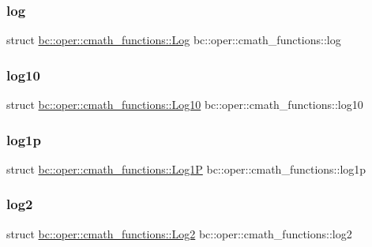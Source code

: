 \subsubsection{\texorpdfstring{log}{log}}
{\footnotesize\ttfamily struct \hyperlink{structbc_1_1oper_1_1cmath__functions_1_1Log}{bc\+::oper\+::cmath\+\_\+functions\+::\+Log}   bc\+::oper\+::cmath\+\_\+functions\+::log}

\mbox{\label{namespacebc_1_1oper_1_1cmath__functions_acb5070f623c08a42cdf87cc9e9bfd90e}} 
\subsubsection{\texorpdfstring{log10}{log10}}
{\footnotesize\ttfamily struct \hyperlink{structbc_1_1oper_1_1cmath__functions_1_1Log10}{bc\+::oper\+::cmath\+\_\+functions\+::\+Log10}   bc\+::oper\+::cmath\+\_\+functions\+::log10}

\mbox{\label{namespacebc_1_1oper_1_1cmath__functions_a347fe439b0e83661864c6b9e5aadc25e}} 
\subsubsection{\texorpdfstring{log1p}{log1p}}
{\footnotesize\ttfamily struct \hyperlink{structbc_1_1oper_1_1cmath__functions_1_1Log1P}{bc\+::oper\+::cmath\+\_\+functions\+::\+Log1P}   bc\+::oper\+::cmath\+\_\+functions\+::log1p}

\mbox{\label{namespacebc_1_1oper_1_1cmath__functions_af4ad6999cc951b3088b80e4e18eca2ee}} 
\subsubsection{\texorpdfstring{log2}{log2}}
{\footnotesize\ttfamily struct \hyperlink{structbc_1_1oper_1_1cmath__functions_1_1Log2}{bc\+::oper\+::cmath\+\_\+functions\+::\+Log2}   bc\+::oper\+::cmath\+\_\+functions\+::log2}

